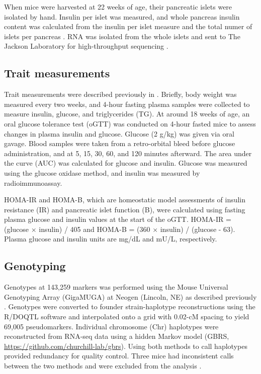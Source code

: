 \documentclass[
]{article}
\begin{document}
When mice were harvested at 22 weeks of age, their pancreatic islets
were isolated by hand. Insulin per islet was measured, and whole
pancreas insulin content was calculated from the insulin per islet
measure and the total numer of islets per pancreas \cite{pmid29567659}.
RNA was isolated from the whole islets and sent to The Jackson
Laboratory for high-throughput sequencing \cite{pmid29567659}.

\subsection{Trait measurements}\label{trait-measurements}

Trait measurements were described previously in \cite{pmid29567659}.
Briefly, body weight was measured every two weeks, and 4-hour fasting
plasma samples were collected to measure insulin, glucose, and
triglycerides (TG). At around 18 weeks of age, an oral glucose tolerance
test (oGTT) was conducted on 4-hour fasted mice to assess changes in
plasma insulin and glucose. Glucose (2 g/kg) was given via oral gavage.
Blood samples were taken from a retro-orbital bleed before glucose
administration, and at 5, 15, 30, 60, and 120 minutes afterward. The
area under the curve (AUC) was calculated for glucose and insulin.
Glucose was measured using the glucose oxidase method, and insulin was
measured by radioimmunoassay.

HOMA-IR and HOMA-B, which are homeostatic model assessments of insulin
resistance (IR) and pancreatic islet function (B), were calculated using
fasting plasma glucose and insulin values at the start of the oGTT.
HOMA-IR = (glucose \(\times\) insulin) / 405 and HOMA-B = (360
\(\times\) insulin) / (glucose - 63). Plasma glucose and insulin units
are mg/dL and mU/L, respectively.

\subsection{Genotyping}\label{genotyping}

Genotypes at 143,259 markers was performed using the Mouse Universal
Genotyping Array (GigaMUGA) \cite{pmid26684931} at Neogen (Lincoln, NE)
as described previously \cite{pmid29567659, pmid22345611}. Genotypes
were converted to founder strain-haplotype reconstructions using the
R/DOQTL software \cite{pmid25237114} and interpolated onto a grid with
0.02-cM spacing to yield 69,005 pseudomarkers. Individual chromosome
(Chr) haplotypes were reconstructed from RNA-seq data using a hidden
Markov model \cite{choi2020genotype} (GBRS,
\url{https://github.com/churchill-lab/gbrs}). Using both methods to call
haplotypes provided redundancy for quality control. Three mice had
inconsistent calls between the two methods and were excluded from the
analysis \cite{pmid29567659}.
\end{document}
